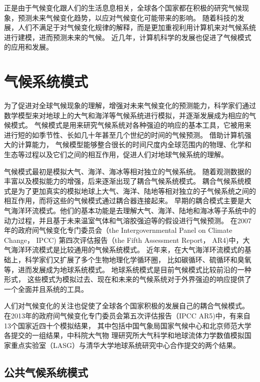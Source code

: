  
正是由于气候变化跟人们的生活息息相关，全球各个国家都在积极的研究气候现象，预测未来气候变化趋势，以应对气候变化可能带来的影响。 
随着科技的发展，人们不满足于对气候变化规律的解释，而是更加重视利用计算机来对气候系统进行建模，进而预测未来的气候。
近几年，计算机科学的发展也促进了气候模式的应用和发展。  



 
\section{气候系统模式}

为了促进对全球气候现象的理解，增强对未来气候变化的预测能力，科学家们通过数学模型来对地球上的大气和海洋等气候系统进行模拟，并逐渐发展成为相应的气候模式。
气候模式是用来研究气候系统对各种强迫的响应的基本工具，它被用来进行短的如季节性、长如几十年甚至几个世纪的时间的气候预测。 
借助计算机强大的计算能力， 气候模型能够整合很长的时间尺度内全球范围内的物理、化学和生态等过程以及它们之间的相互作用，促进人们对地球气候系统的理解\cite{hurrell2013community}。


气候模式最初是模拟大气、海洋、海冰等相对独立的气候系统。
随着观测数据的丰富以及模拟能力的增强，后来逐渐出现了耦合气候系统模式。
耦合气候系统模式是为了更加真实的模拟地球上大气、海洋、陆地等相对独立的子气候系统之间的相互作用，而将这些的气候模式通过耦合器连接起来\cite{hurrell2013community, liu2014c}。
早期的耦合模式主要是大气海洋环流模式。他们的基本功能是去理解大气、海洋、陆地和海冰等子系统中的动力过程，并且基于未来温室气体和气溶胶强迫等的假设进行气候预测。
在2007年的政府间气候变化专门委员会（the
Intergovernmental Panel on Climate Change， IPCC) 第四次评估报告（the Fifth Assessment
Report， AR4)中，大气海洋环流模式是比较通用的气候系统模式\cite{solomon2007climate}。
近年来，在大气海洋环流模式的基础上，科学家们又扩展了多个生物地理化学循环圈， 比如碳循环、硫循环和臭氧等，进而发展成为地球系统模式。 地球系统模式是目前气候模式比较前沿的一种形式，
这些模式为模拟过去、现在和未来的气候系统对于外界强迫的响应提供了一个全面并且系统的工具。 

人们对气候变化的关注也促使了全球各个国家积极的发展自己的耦合气候模式。
在2013年的政府间气候变化专门委员会第五次评估报告（IPCC AR5)中，有来自13个国家近四十个模拟结果，
其中包括中国气象局国家气候中心和北京师范大学各提交的一组结果，中科院大气物
理研究所大气科学和地球流体力学数值模拟国家重点实验室（LASG）与清华大学地球系统研究中心合作提交的两个结果\cite{stocker2013ipcc}。



\subsection{公共气候系统模式}
 

